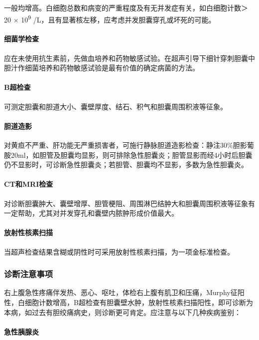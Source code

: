 一般均增高。白细胞总数和病变的严重程度及有无并发症有关，如白细胞计数＞
20 × 10\textsuperscript{9}
/L，且有显著核左移，应考虑并发胆囊穿孔或坏死的可能。

\paragraph{细菌学检查}

应在未使用抗生素前，先做血培养和药物敏感试验。在超声引导下细针穿刺胆囊中胆汁作细菌培养和药物敏感试验是最有价值的确定病菌的方法。

\paragraph{B超检查}

可测定胆囊和胆道大小、囊壁厚度、结石、积气和胆囊周围积液等征象。

\paragraph{胆道造影}

对黄疸不严重、肝功能无严重损害者，可施行静脉胆道造影检查：静注30\%胆影葡胺20ml，如胆管及胆囊均显影，则可排除急性胆囊炎；胆管显影而经4小时后胆囊仍不显影时，可诊断急性胆囊炎；若胆管、胆囊均不显影，多数为急性胆囊炎。

\paragraph{CT和MRI检查}

对诊断胆囊肿大、囊壁增厚、胆管梗阻、周围淋巴结肿大和胆囊周围积液等征象有一定帮助，尤其对并发穿孔和囊壁内脓肿形成价值最大。

\paragraph{放射性核素扫描}

当超声检查结果含糊或阴性时可采用放射性核素扫描，为一项金标准检查。

\subsubsection{诊断注意事项}

右上腹急性疼痛伴发热、恶心、呕吐，体检右上腹有肌卫和压痛，Murphy征阳性，白细胞计数增高，B超检查有胆囊壁水肿，放射性核素扫描阳性，即可诊断为本病，如过去有胆绞痛病史，则诊断更可肯定。应注意与以下几种疾病鉴别：

\paragraph{急性胰腺炎}

